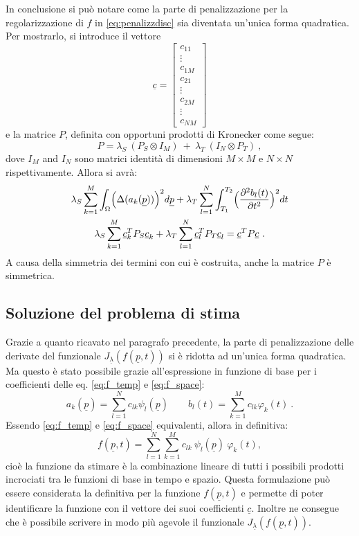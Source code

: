 \documentclass[a4paper,11pt,twoside,openright]{book}							%
\begin{document}
In conclusione si può notare come la parte di penalizzazione per la regolarizzazione di $f$ in \ref{eq:penalizzdisc} sia diventata un'unica forma quadratica. Per mostrarlo, si introduce il vettore
$$\underline c =
\begin{bmatrix}
c_{11}  \\
\vdots\\
c_{1M}  \\
c_{21}  \\
\vdots\\
c_{2M}  \\
\vdots\\
c_{NM}
\end{bmatrix}
$$
e la matrice $P$, definita con opportuni prodotti di Kronecker come segue:
$$
P = \lambda_S\    (P_S \otimes I_M)   \ +\  \lambda_T\   (I_N \otimes P_T) \ ,
$$
dove $I_M$ and $I_N$ sono matrici identità di dimensioni $M \times M$ e $N \times N$ rispettivamente. Allora si avrà:
\begin{multline}
\lambda_S  \sum_{k=1}^M \int_{\Omega} \Bigl( \Delta(  a_k(\underline p)  ) \Bigr)^2 d \underline p + \lambda_T \sum_{l=1}^N\int_{T_1}^{T_2} \Bigl( \frac{\partial^2   b_l(t)   }{\partial t ^2} \Bigr)^2 dt 
\\ \lambda_S\sum_{k=1}^M\underline{c}_k^T P_S \underline{c}_k + \lambda_T\sum_{l=1}^N\underline{c}_l^T P_T \underline{c}_l = \underline{c}^T P \underline{c} \ .
\end{multline}
A causa della simmetria dei termini con cui è costruita, anche la matrice $P$ è simmetrica.


\subsection{Soluzione del problema di stima}
Grazie a quanto ricavato nel paragrafo precedente, la parte di penalizzazione delle derivate del funzionale $J_{\underline \lambda }(f(\underline p,t))$ si è ridotta ad un'unica forma quadratica. Ma questo è stato possibile grazie all'espressione in funzione di base per i coefficienti delle eq. \ref{eq:f_temp} e \ref{eq:f_space}:
$$
a_k(\underline p)=\sum_{l=1}^N c_{lk}\psi_l(\underline p) \qquad b_l(t)=\sum_{k=1}^M c_{lk}\varphi_k(t) \ .
$$
Essendo \ref{eq:f_temp} e \ref{eq:f_space} equivalenti, allora in definitiva:
\begin{equation} 
\label{eq:basisexp}
f(\underline p,t)=\sum_{l=1}^N \sum_{k=1}^M c_{lk}\ \psi_l(\underline p)\ \varphi_k(t) ,
\end{equation}
cioè la funzione da stimare è la combinazione lineare di tutti i possibili prodotti incrociati tra le funzioni di base in tempo e spazio. Questa formulazione può essere considerata la definitiva per la funzione $f(\underline p,t)$ e permette di poter identificare la funzione con il vettore dei suoi coefficienti $\underline{c}$. Inoltre ne consegue che è possibile scrivere in modo più agevole il funzionale $J_{\underline \lambda }(f(\underline p,t))$.
\end{document}
